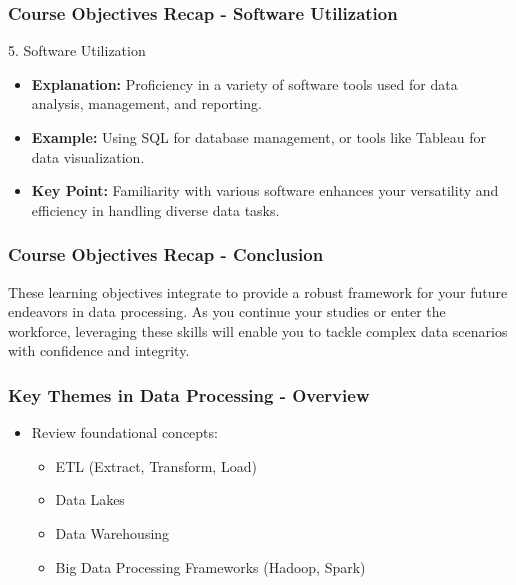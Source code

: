\documentclass[aspectratio=169]{beamer}
\begin{document}
\begin{frame}[fragile]
    \frametitle{Course Objectives Recap - Software Utilization}
    \begin{block}{5. Software Utilization}
        \begin{itemize}
            \item \textbf{Explanation:} Proficiency in a variety of software tools used for data analysis, management, and reporting.
            \item \textbf{Example:} Using SQL for database management, or tools like Tableau for data visualization.
            \item \textbf{Key Point:} Familiarity with various software enhances your versatility and efficiency in handling diverse data tasks.
        \end{itemize}
    \end{block}
\end{frame}

\begin{frame}[fragile]
    \frametitle{Course Objectives Recap - Conclusion}
    These learning objectives integrate to provide a robust framework for your future endeavors in data processing. As you continue your studies or enter the workforce, leveraging these skills will enable you to tackle complex data scenarios with confidence and integrity.
\end{frame}

\begin{frame}[fragile]
    \frametitle{Key Themes in Data Processing - Overview}
    \begin{itemize}
        \item Review foundational concepts:
        \begin{itemize}
            \item ETL (Extract, Transform, Load)
            \item Data Lakes
            \item Data Warehousing
            \item Big Data Processing Frameworks (Hadoop, Spark)
        \end{itemize}
    \end{itemize}
\end{frame}
\end{document}
